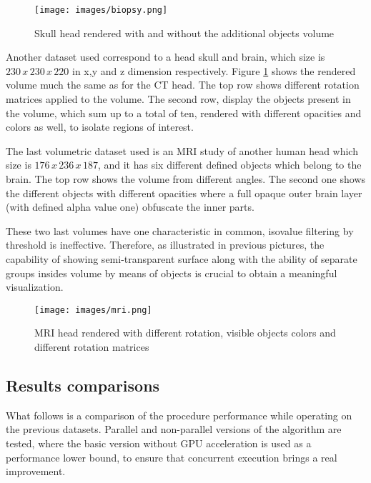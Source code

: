 \documentclass[12pt,a4paper]{extarticle}
\newcommand{\linespace}{\vspace{0pt}}
\begin{document}
\begin{figure}[hbtp]
\centering
\texttt{[image: images/biopsy.png]}
\caption{Skull head rendered with and without the additional objects volume}
\label{fig:biopsy}
\end{figure}


Another dataset used correspond to a head skull and brain, which size is $230\,x\,230\,x\,220$ in x,y and z dimension respectively.
Figure \ref{fig:biopsy} shows the rendered volume much the same as for the CT head. The top row shows different rotation matrices applied to the volume. The second row, display the objects present in the volume, which sum up to a total of ten, rendered with different opacities and colors as well, to isolate regions of interest.
\linespace

The last volumetric dataset used is an MRI study of another human head which size is $176\,x\,236\,x\,187$, and it has six different defined objects which belong to the brain. The top row shows the volume from different angles. The second one shows the different objects with different opacities where a full opaque outer brain layer (with defined alpha value one) obfuscate the inner parts.
\linespace 

These two last volumes have one characteristic in common, isovalue filtering by threshold is ineffective. Therefore, as illustrated in previous pictures, the capability of showing semi-transparent surface along with the ability of separate groups insides volume by means of objects is crucial to obtain a meaningful visualization.

\begin{figure}[hbtp]
\centering
\texttt{[image: images/mri.png]}
\caption{MRI head rendered with different rotation, visible objects colors and different rotation matrices }
\label{fig:mri}
\end{figure}
\subsection{Results comparisons} 
What follows is a comparison of the procedure performance while operating on the previous datasets. Parallel and non-parallel versions of the algorithm are tested, where the basic version without GPU acceleration is used as a performance lower bound, to ensure that concurrent execution brings a real improvement.
\end{document}

